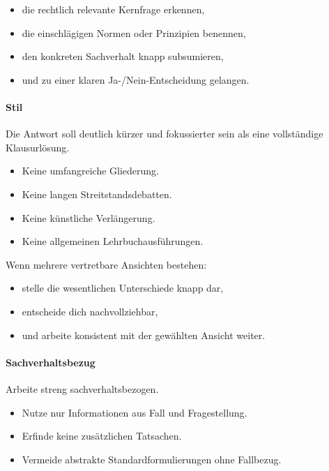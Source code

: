 \documentclass[11pt]{article}
\providecommand{\tightlist}{%
  \setlength{\itemsep}{0pt}\setlength{\parskip}{0pt}}
\begin{document}
\begin{itemize}
\tightlist
\item
  die rechtlich relevante Kernfrage erkennen,
\item
  die einschlägigen Normen oder Prinzipien benennen,
\item
  den konkreten Sachverhalt knapp subsumieren,
\item
  und zu einer klaren Ja-/Nein-Entscheidung gelangen.
\end{itemize}

\paragraph{Stil}\label{stil}

Die Antwort soll deutlich kürzer und fokussierter sein als eine
vollständige Klausurlösung.

\begin{itemize}
\tightlist
\item
  Keine umfangreiche Gliederung.
\item
  Keine langen Streitstandsdebatten.
\item
  Keine künstliche Verlängerung.
\item
  Keine allgemeinen Lehrbuchausführungen.
\end{itemize}

Wenn mehrere vertretbare Ansichten bestehen:

\begin{itemize}
\tightlist
\item
  stelle die wesentlichen Unterschiede knapp dar,
\item
  entscheide dich nachvollziehbar,
\item
  und arbeite konsistent mit der gewählten Ansicht weiter.
\end{itemize}

\paragraph{Sachverhaltsbezug}\label{sachverhaltsbezug}

Arbeite streng sachverhaltsbezogen.

\begin{itemize}
\tightlist
\item
  Nutze nur Informationen aus Fall und Fragestellung.
\item
  Erfinde keine zusätzlichen Tatsachen.
\item
  Vermeide abstrakte Standardformulierungen ohne Fallbezug.
\end{itemize}
\end{document}
